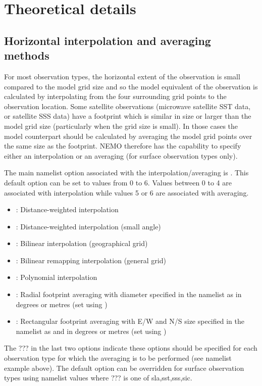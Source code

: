 \documentclass[../main/NEMO_manual]{subfiles}
\begin{document}
\section{Theoretical details}
\label{sec:OBS_theory}

\subsection{Horizontal interpolation and averaging methods}

For most observation types, the horizontal extent of the observation is small compared to the model grid size and so
the model equivalent of the observation is calculated by interpolating from
the four surrounding grid points to the observation location.
Some satellite observations (\eg microwave satellite SST data, or satellite SSS data) have a footprint which
is similar in size or larger than the model grid size (particularly when the grid size is small).
In those cases the model counterpart should be calculated by averaging the model grid points over
the same size as the footprint.
NEMO therefore has the capability to specify either an interpolation or an averaging
(for surface observation types only). 

The main namelist option associated with the interpolation/averaging is .
This default option can be set to values from 0 to 6.
Values between 0 to 4 are associated with interpolation while values 5 or 6 are associated with averaging.
\begin{itemize}
\item {}: Distance-weighted interpolation
\item {}: Distance-weighted interpolation (small angle)
\item {}: Bilinear interpolation (geographical grid)
\item {}: Bilinear remapping interpolation (general grid)
\item {}: Polynomial interpolation
\item {}: Radial footprint averaging with diameter specified in the namelist as
   in degrees or metres (set using )
\item {}: Rectangular footprint averaging with E/W and N/S size specified in
  the namelist as  and  in degrees or metres
  (set using )
\end{itemize}
The ??? in the last two options indicate these options should be specified for each observation type for
which the averaging is to be performed (see namelist example above).
The  default option can be overridden for surface observation types using
namelist values  where ??? is one of sla,sst,sss,sic.
\end{document}
